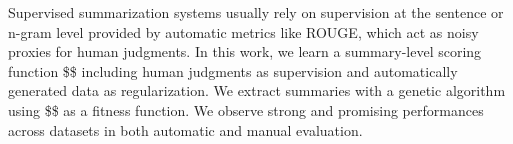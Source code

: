 Supervised summarization systems usually rely on supervision at the sentence or n-gram level provided by automatic metrics like ROUGE, which act as noisy proxies for human judgments. In this work, we learn a summary-level scoring function \$\theta\$ including human judgments as supervision and automatically generated data as regularization. We extract summaries with a genetic algorithm using \$\theta\$ as a fitness function. We observe strong and promising performances across datasets in both automatic and manual evaluation.
